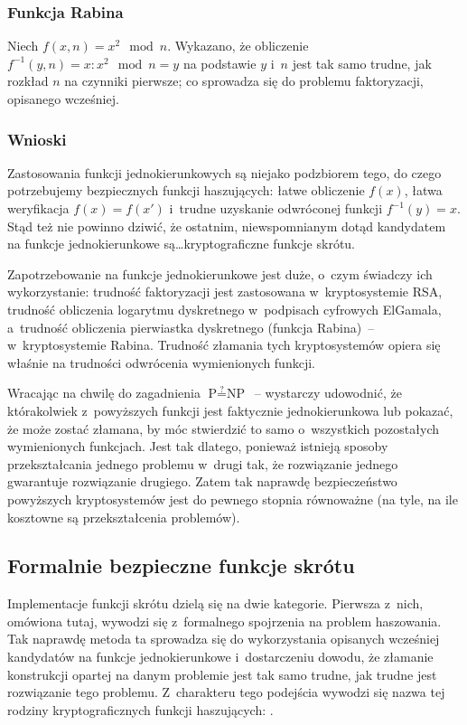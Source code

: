 \documentclass[12pt,a4paper,twoside]{article}
\begin{document}
\subsubsection{Funkcja Rabina}
Niech $f(x,n) = x^2 \mod n$. Wykazano, że obliczenie $f^{-1}(y,n) = x : x^2
\mod n = y$ na podstawie $y$ i~$n$ jest tak samo trudne, jak rozkład $n$ na
czynniki pierwsze; co sprowadza się do problemu faktoryzacji, opisanego
wcześniej.



\subsubsection{Wnioski}
Zastosowania funkcji jednokierunkowych są niejako podzbiorem tego, do czego
potrzebujemy bezpiecznych funkcji haszujących: łatwe obliczenie $f(x)$, łatwa
weryfikacja $f(x)=f(x')$ i~trudne uzyskanie odwróconej funkcji $f^{-1}(y)=x$.
Stąd też nie powinno dziwić, że ostatnim, niewspomnianym dotąd kandydatem na
funkcje jednokierunkowe są\ldots kryptograficzne funkcje skrótu.

Zapotrzebowanie na funkcje jednokierunkowe jest duże, o~czym świadczy ich
wykorzystanie: trudność faktoryzacji jest zastosowana w~kryptosystemie RSA,
trudność obliczenia logarytmu dyskretnego w~podpisach cyfrowych ElGamala,
a~trudność obliczenia pierwiastka dyskretnego (funkcja Rabina)~--
w~kryptosystemie Rabina. Trudność złamania tych kryptosystemów opiera się
właśnie na trudności odwrócenia wymienionych funkcji.

Wracając na chwilę do zagadnienia $\textrm{P} \stackrel{?}{=} \textrm{NP}$~--
wystarczy udowodnić, że którakolwiek z~powyższych funkcji jest faktycznie
jednokierunkowa lub pokazać, że może zostać złamana, by móc stwierdzić to samo
o~wszystkich pozostałych wymienionych funkcjach. Jest tak dlatego, ponieważ
istnieją sposoby przekształcania jednego problemu w~drugi tak, że rozwiązanie
jednego gwarantuje rozwiązanie drugiego. Zatem tak naprawdę bezpieczeństwo
powyższych kryptosystemów jest do pewnego stopnia równoważne (na tyle, na ile
kosztowne są przekształcenia problemów).



\pagebreak
\subsection{Formalnie bezpieczne funkcje skrótu}
Implementacje funkcji skrótu dzielą się na dwie kategorie. Pierwsza z~nich,
omówiona tutaj, wywodzi się z~formalnego spojrzenia na problem haszowania. Tak
naprawdę metoda ta sprowadza się do wykorzystania opisanych wcześniej
kandydatów na funkcje jednokierunkowe i~dostarczeniu dowodu, że złamanie
konstrukcji opartej na danym problemie jest tak samo trudne, jak trudne jest
rozwiązanie tego problemu. Z~charakteru tego podejścia wywodzi się nazwa tej
rodziny kryptograficznych funkcji haszujących: .
\end{document}
